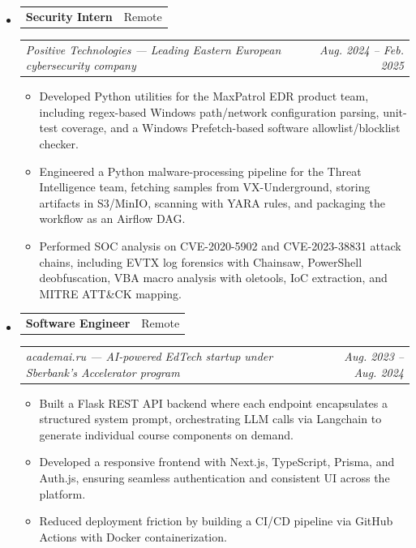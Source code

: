 \documentclass[11pt,letterpaper]{article}
\makeatletter
\newcommand{\headerrow}[2]
{\begin{tabular*}{\linewidth}{l@{\extracolsep{\fill}}r}
#1 & #2 \\
\end{tabular*}}
\makeatother
\begin{document}
\renewcommand\labelitemi{}
\renewcommand\labelitemii{$\bullet$}
\begin{itemize}[leftmargin=0em, itemsep=0.6em]
    \parskip=0.1em

    \item
    \headerrow
        {\textbf{Security Intern}}
        {Remote}
    \headerrow
        {\emph{Positive Technologies --- Leading Eastern European cybersecurity company}}
        {\emph{Aug. 2024 -- Feb. 2025}}
    \begin{itemize}[leftmargin=1.2em, itemsep=0.1em]
        \renewcommand\labelitemi{$\bullet$}
        \item Developed Python utilities for the MaxPatrol EDR product team, including regex-based Windows path/network configuration parsing, unit-test coverage, and a Windows Prefetch-based software allowlist/blocklist checker.
        \item Engineered a Python malware-processing pipeline for the Threat Intelligence team, fetching samples from VX-Underground, storing artifacts in S3/MinIO, scanning with YARA rules, and packaging the workflow as an Airflow DAG.
        \item Performed SOC analysis on CVE-2020-5902 and CVE-2023-38831 attack chains, including EVTX log forensics with Chainsaw, PowerShell deobfuscation, VBA macro analysis with oletools, IoC extraction, and MITRE ATT\&CK mapping.
    \end{itemize}

    \item
    \headerrow
        {\textbf{Software Engineer}}
        {Remote}
    \headerrow
        {\emph{academai.ru --- AI-powered EdTech startup under Sberbank's Accelerator program}}
        {\emph{Aug. 2023 -- Aug. 2024}}
    \begin{itemize}[leftmargin=1.2em, itemsep=0.1em]
        \renewcommand\labelitemi{$\bullet$}
        \item Built a Flask REST API backend where each endpoint encapsulates a structured system prompt, orchestrating LLM calls via Langchain to generate individual course components on demand.
        \item Developed a responsive frontend with Next.js, TypeScript, Prisma, and Auth.js, ensuring seamless authentication and consistent UI across the platform.
        \item Reduced deployment friction by building a CI/CD pipeline via GitHub Actions with Docker containerization.
    \end{itemize}

\end{itemize}
\end{document}

